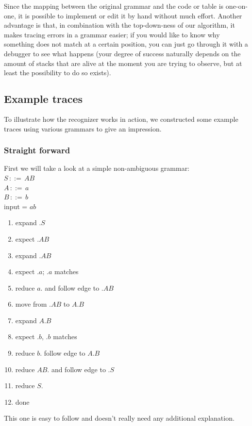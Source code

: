\documentclass[a4paper,10pt]{article}
\begin{document}
Since the mapping between the original grammar and the code or table is one-on-one, it is possible to implement or edit it by hand without much effort. Another advantage is that, in combination with the top-down-ness of our algorithm, it makes tracing errors in a grammar easier; if you would like to know why something does not match at a certain position, you can just go through it with a debugger to see what happens (your degree of success naturally depends on the amount of stacks that are alive at the moment you are trying to observe, but at least the possibility to do so exists).

\subsection{Example traces}

To illustrate how the recognizer works in action, we constructed some example traces using various grammars to give an impression.

\pagebreak
\subsubsection{Straight forward}
First we will take a look at a simple non-ambiguous grammar:\\
$S\,::=\,AB$\\
$A\,::=\,a$\\
$B\,::=\,b$\\
input = $ab$

\begin{enumerate}
 \setlength{\itemsep}{0pt}
 \setlength{\parskip}{0pt}
 \setlength{\parsep}{0pt}
 
 \item expand $.S$
 \item expect $.AB$
 \item expand $.AB$
 \item expect $.a$; $.a$ matches
 \item reduce $a.$ and follow edge to $.AB$
 \item move from $.AB$ to $A.B$
 \item expand $A.B$
 \item expect $.b$, $.b$ matches
 \item reduce $b.$ follow edge to $A.B$
 \item reduce $AB.$ and follow edge to $.S$
 \item reduce $S.$
 \item done
\end{enumerate}
This one is easy to follow and doesn't really need any additional explanation.
\end{document}
